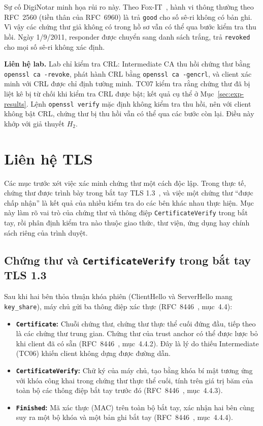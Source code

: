 Sự cố DigiNotar minh họa rủi ro này. Theo Fox-IT~\cite{prins2011diginotar}, hành vi thông thường theo RFC~2560 (tiền thân của RFC~6960) là trả \texttt{good} cho số sê-ri không có bản ghi. Vì vậy các chứng thư giả không có trong hồ sơ vẫn có thể qua bước kiểm tra thu hồi. Ngày 1/9/2011, responder được chuyển sang danh sách trắng, trả \texttt{revoked} cho mọi số sê-ri không xác định.

\noindent\textbf{Liên hệ lab.} Lab chỉ kiểm tra CRL: Intermediate CA thu hồi chứng thư bằng \texttt{openssl ca -revoke}, phát hành CRL bằng \texttt{openssl ca -gencrl}, và client xác minh với CRL được chỉ định tường minh. TC07 kiểm tra rằng chứng thư đã bị liệt kê bị từ chối khi kiểm tra CRL được bật; kết quả cụ thể ở Mục~\ref{sec:exp-results}. Lệnh \texttt{openssl verify} mặc định không kiểm tra thu hồi, nên với client không bật CRL, chứng thư bị thu hồi vẫn có thể qua các bước còn lại. Điều này khớp với giả thuyết $H_2$.

\section{Liên hệ TLS}
\label{sec:tls-relation}

Các mục trước xét việc xác minh chứng thư một cách độc lập. Trong thực tế, chứng thư được trình bày trong bắt tay TLS 1.3~\cite{rfc8446}, và việc một chứng thư ``được chấp nhận'' là kết quả của nhiều kiểm tra do các bên khác nhau thực hiện. Mục này làm rõ vai trò của chứng thư và thông điệp \texttt{CertificateVerify} trong bắt tay, rồi phân định kiểm tra nào thuộc giao thức, thư viện, ứng dụng hay chính sách riêng của trình duyệt.

\subsection{Chứng thư và \texttt{CertificateVerify} trong bắt tay TLS 1.3}
\label{subsec:tls-cert-verify}

Sau khi hai bên thỏa thuận khóa phiên (ClientHello và ServerHello mang \texttt{key\_share}), máy chủ gửi ba thông điệp xác thực (RFC~8446~\cite{rfc8446}, mục~4.4):
\begin{itemize}
    \item \textbf{\texttt{Certificate}:} Chuỗi chứng thư, chứng thư thực thể cuối đứng đầu, tiếp theo là các chứng thư trung gian. Chứng thư của trust anchor có thể được lược bỏ khi client đã có sẵn (RFC~8446~\cite{rfc8446}, mục~4.4.2). Đây là lý do thiếu Intermediate (TC06) khiến client không dựng được đường dẫn.
    \item \textbf{\texttt{CertificateVerify}:} Chữ ký của máy chủ, tạo bằng khóa bí mật tương ứng với khóa công khai trong chứng thư thực thể cuối, tính trên giá trị băm của toàn bộ các thông điệp bắt tay trước đó (RFC~8446~\cite{rfc8446}, mục~4.4.3).
    \item \textbf{\texttt{Finished}:} Mã xác thực (MAC) trên toàn bộ bắt tay, xác nhận hai bên cùng suy ra một bộ khóa và một bản ghi bắt tay (RFC~8446~\cite{rfc8446}, mục~4.4.4).
\end{itemize}

